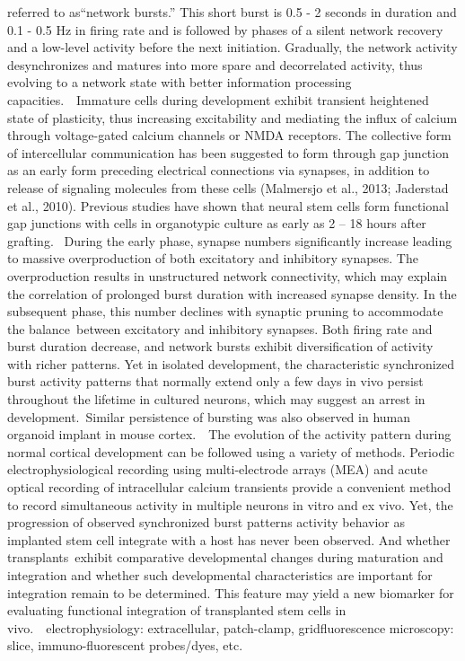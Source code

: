 referred to as“network bursts.” This short burst is 0.5 - 2  seconds in duration and 0.1 - 0.5 Hz in firing rate and is followed by phases  of a silent network recovery and a low-level activity before the next  initiation. Gradually, the network activity desynchronizes and matures into  more spare and decorrelated activity, thus evolving to a network state with  better information processing capacities.  Immature  cells during development exhibit transient heightened state of plasticity, thus  increasing excitability and mediating the influx of calcium through  voltage-gated calcium channels or NMDA receptors. The collective form of  intercellular communication has been suggested to form through gap junction as  an early form preceding electrical connections via synapses, in addition to  release of signaling molecules from these cells (Malmersjo et al., 2013;  Jaderstad et al., 2010). Previous studies have shown that neural stem cells  form functional gap junctions with cells in organotypic culture as early as 2 –  18 hours after grafting.  During the  early phase, synapse numbers significantly increase leading to massive  overproduction of both excitatory and inhibitory synapses. The overproduction results  in unstructured network connectivity, which may explain the correlation of  prolonged burst duration with increased synapse density. In the subsequent  phase, this number declines with synaptic pruning to accommodate the balance between  excitatory and inhibitory synapses. Both firing rate and burst duration  decrease, and network bursts exhibit diversification of activity with richer  patterns. Yet in isolated development, the characteristic synchronized burst  activity patterns that normally extend only a few days in vivo persist  throughout the lifetime in cultured neurons, which may suggest an arrest in  development. Similar persistence of bursting was also observed in human  organoid implant in mouse cortex.  The evolution  of the activity pattern during normal cortical development can be followed  using a variety of methods. Periodic electrophysiological recording using  multi-electrode arrays (MEA) and acute optical recording of intracellular  calcium transients provide a convenient method to record simultaneous activity  in multiple neurons in vitro and ex vivo. Yet, the progression of observed  synchronized burst patterns activity behavior as implanted stem cell integrate  with a host has never been observed. And whether transplants exhibit  comparative developmental changes during maturation and integration and whether  such developmental characteristics are important for integration remain to be  determined. This feature may yield a new biomarker for evaluating functional integration  of transplanted stem cells in vivo.  electrophysiology: extracellular, patch-clamp, gridfluorescence microscopy: slice, immuno-fluorescent probes/dyes, etc.

